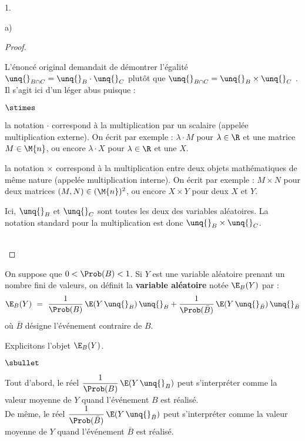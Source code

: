 \begin{noliste}{1.}
\begin{noliste}{a)}
\begin{proof}
      
      \newpage
      
      
      \begin{remark}
        L'énoncé original demandait de démontrer l'égalité \og $
        \unq{}_{B \cap C} = \unq{}_B \cdot \unq{}_C$ \fg{} plutôt que 
        \og $\unq{}_{B \cap C} = \unq{}_B \times \unq{}_C$ \fg{}.\\
        Il s'agit ici d'un léger abus puisque :
        \begin{noliste}{$\stimes$}
          \item la notation $\cdot$ correspond à la multiplication par 
          un scalaire (appelée multiplication externe). On écrit par 
	  exemple : $\lambda \cdot M$ pour 
          $\lambda \in \R$ et une matrice $M \in \M{n}$, ou encore 
	  $\lambda \cdot 
          X$ pour $\lambda \in \R$ et une \var $X$.
          
          \item la notation $\times$ correspond à la multiplication
          entre deux objets mathématiques de même nature (appelée 
          multiplication interne). On écrit par exemple : $M \times N$
          pour deux matrices $(M,N) \in (\M{n})^2$, ou encore $X \times
          Y$ pour deux \var $X$ et $Y$.
        \end{noliste}
        Ici, $\unq{}_B$ et $\unq{}_C$ sont toutes les deux des 
        variables aléatoires. La notation standard pour la 
        multiplication est donc $\unq{}_B \times \unq{}_C$.
      \end{remark}~\\[-1.4cm]
    \end{proof}
    
    \item On suppose que $0 < \Prob(B) < 1$. Si $Y$ est une variable
    aléatoire prenant un nombre fini de valeurs, on définit la {\bf 
    variable aléatoire} notée $\E_B(Y)$ par :
    \[
      \E_B(Y) \ = \ \dfrac{1}{\Prob(B)} \, \E(Y \, \unq{}_B) \, 
      \unq{}_B + \dfrac{1}{\Prob(\bar{B})} \, \E(Y \, \unq{}_{\bar{B}})
      \, \unq{}_{\bar{B}}
    \]
    où $\bar{B}$ désigne l'événement contraire de $B$.
    
    \begin{remarkL}{.96}
      Explicitons l'objet $\E_B(Y)$.
      \begin{noliste}{$\sbullet$}
        \item Tout d'abord, le réel $\dfrac{1}{\Prob(B)}
        \, \E(Y \, \unq{}_B)$ peut s'interpréter comme la valeur 
        moyenne de $Y$ quand l'événement $B$ est réalisé.\\[.1cm]
        De même, le réel $\dfrac{1}{\Prob(\bar{B})}
        \, \E(Y \, \unq{}_{\bar{B}})$ peut s'interpréter comme la 
	valeur moyenne de $Y$ quand l'événement $\bar{B}$ est réalisé.
	

\end{noliste}
\end{remarkL}
\end{noliste}
\end{noliste}
